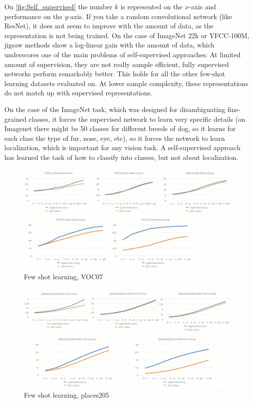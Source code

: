 On \ref{fig:Self_supervised} the number $k$ is represented on the $x$-axis and performance on the $y$-axis. If you take a random convolutional network (like ResNet), it does not seem to improve with the amount of data, as the representation is not being trained. On the case of ImageNet 22k or YFCC-100M, jigsaw methods show a log-linear gain with the amount of data, which underscores one of the main problems of self-supervised approaches: At limited amount of supervision, they are not really sample efficient, fully supervised networks perform remarkably better. This holds for all the other few-shot learning datasets evaluated on. At lower sample complexity, these representations do not match up with supervised representations.

On the case of the ImageNet task, which was designed for disambiguating fine-grained classes, it forces the supervised network to learn very specific details (on Imagenet there might be 50 classes for different breeds of dog, so it learns for each class the type of fur, nose, eye, etc), so it forces the network to learn localization, which is important for any vision task. A self-supervised approach has learned the task of how to classify into classes, but not about localization.

\begin{figure}[H]
\centering
\includegraphics[width=0.8\linewidth]{figs/VOC07.png}
\caption{Few shot learning, VOC07}\label{fig:VOC07}
\end{figure}
\begin{figure}[H]
\centering
\includegraphics[width=0.8\linewidth]{figs/places205.png}
\caption{Few shot learning, places205}\label{fig:places205}
\end{figure}

